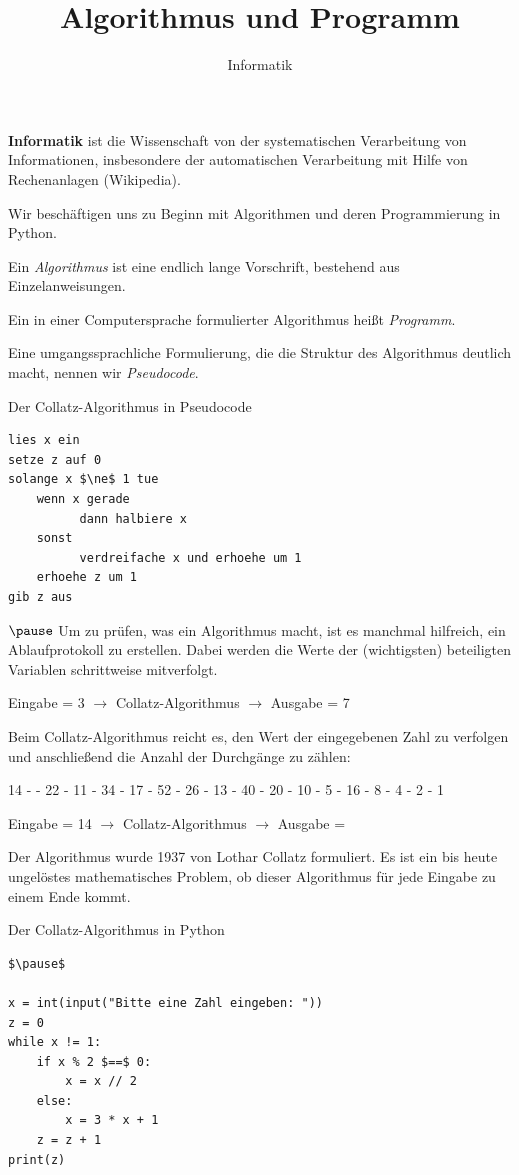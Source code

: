 \documentclass[10pt]{beamer}
\begin{document}
\title{Algorithmus und Programm}   
\author{Informatik} 
\date{ } 

\frame{\titlepage} 

\begin{frame}[fragile]
\textbf{Informatik} ist die Wissenschaft von der systematischen Verarbeitung von Informationen, insbesondere der automatischen Verarbeitung mit Hilfe von Rechenanlagen (Wikipedia). \pause

Wir beschäftigen uns zu Beginn mit Algorithmen und deren Programmierung in Python. \pause

Ein \textit{Algorithmus} ist eine endlich lange Vorschrift, bestehend aus Einzelanweisungen. \pause

Ein in einer Computersprache formulierter Algorithmus heißt \textit{Programm}. \pause

Eine umgangssprachliche Formulierung, die die Struktur des Algorithmus deutlich macht, nennen wir  \textit{Pseudocode}. 

\end{frame}

\begin{frame}[fragile]

Der Collatz-Algorithmus in Pseudocode
\begin{lstlisting} 
lies x ein    
setze z auf 0
solange x $\ne$ 1 tue
    wenn x gerade
          dann halbiere x
    sonst 
          verdreifache x und erhoehe um 1
    erhoehe z um 1
gib z aus     
\end{lstlisting} $\pause$
Um zu prüfen, was ein Algorithmus macht, ist es manchmal hilfreich, ein Ablaufprotokoll zu erstellen. Dabei werden die Werte der (wichtigsten) beteiligten Variablen schrittweise mitverfolgt. \pause

Eingabe = 3 \pause$\rightarrow$ Collatz-Algorithmus  $\rightarrow$ Ausgabe =  7


\end{frame}

\begin{frame}[fragile]
Beim Collatz-Algorithmus reicht es, den Wert der eingegebenen Zahl zu verfolgen und anschließend die Anzahl der Durchgänge zu zählen:

14 -  - 22 - 11 - 34 - 17 - 52 - 26 - 13 - 40 - 20 - 10 - 5 - 16 - 8 - 4 - 2 - 1

Eingabe = 14 $\rightarrow$ Collatz-Algorithmus  $\rightarrow$ Ausgabe =   \pause 

Der Algorithmus wurde 1937 von Lothar Collatz formuliert. 
Es ist ein bis heute ungelöstes mathematisches Problem, ob dieser Algorithmus für jede Eingabe zu einem Ende kommt.
\end{frame}
\begin{frame}[fragile]
Der Collatz-Algorithmus in Python

\begin{lstlisting} 
$\pause$

x = int(input("Bitte eine Zahl eingeben: "))  
z = 0
while x != 1:
    if x % 2 $==$ 0:
        x = x // 2
    else:
        x = 3 * x + 1
    z = z + 1
print(z)
\end{lstlisting} 
\end{frame}
\end{document}
